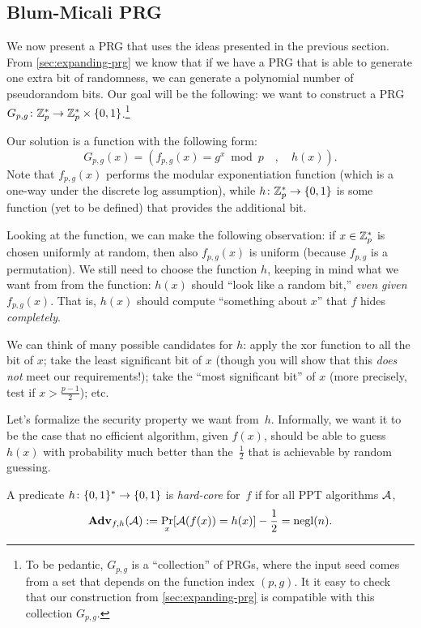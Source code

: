 \documentclass[11pt]{article}
\begin{document}

\subsection{Blum-Micali PRG}
\label{sec:blum-micali-prg}

We now present a PRG that uses the ideas presented in the previous section.
From \cref{sec:expanding-prg} we know that if we have a PRG that is able to generate one extra bit of randomness, we can generate a polynomial number of pseudorandom bits.
Our goal will be the following: we want to construct a PRG $G_{p,g} \colon \mathbb{Z}_p^* \to \mathbb{Z}_p^* \times \{0,1\}$.\footnote{To be pedantic, $G_{p,g}$ is a ``collection'' of PRGs, where the input seed comes from a set that depends on the function index $(p,g)$.
  It it easy to check that our construction from \cref{sec:expanding-prg} is compatible with this collection $G_{p,g}$.}

Our solution is a function with the following form: \[ G_{p,g}(x)= (f_{p,g}(x)=g^x \bmod p \quad, \quad h(x)).
\] Note that $f_{p,g}(x)$ performs the modular exponentiation function (which is a one-way under the discrete log assumption), while $h \colon \mathbb{Z}_p^{*} \to \{0,1\}$ is some function (yet to be defined) that provides the additional bit.

Looking at the function, we can make the following observation: if $x \in \mathbb{Z}_p^{*}$ is chosen uniformly at random, then also $f_{p,g}(x)$ is uniform (because $f_{p,g}$ is a permutation).
We still need to choose the function $h$, keeping in mind what we want from from the function: $h(x)$ should ``look like a random bit,'' \emph{even given $f_{p,g}(x)$}.
That is, $h(x)$ should compute ``something about $x$'' that $f$ hides \emph{completely}.

We can think of many possible candidates for $h$: apply the xor function to all the bit of $x$; take the least significant bit of $x$ (though you will show that this \emph{does not} meet our requirements!); take the ``most significant bit'' of $x$ (more precisely, test if $x>\frac{p-1}{2}$); etc.

Let's formalize the security property we want from~$h$.
Informally, we want it to be the case that no efficient algorithm, given $f(x)$, should be able to guess $h(x)$ with probability much better than the~$\frac{1}{2}$ that is achievable by random guessing.

\begin{definition}
  \label{def:hard-core-pred}
  A predicate $h \colon \{0,1\}^* \to \{0,1\}$ is \emph{hard-core} for~$f$ if for all PPT algorithms $\mathcal{A}$,
  \[ \mathbf{Adv}_{f,h}(\mathcal{A}) := \Pr_{x}[\mathcal{A}(f(x))=h(x)] - \frac12 = \operatorname{negl}(n).
  \]
\end{definition}
\end{document}
